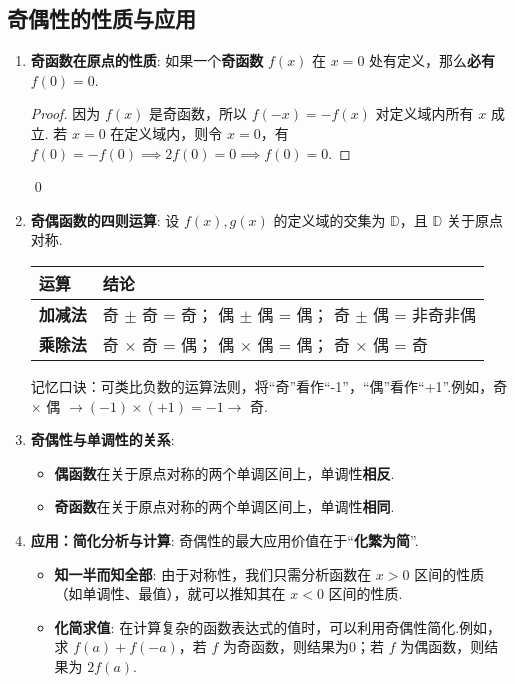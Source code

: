 \subsection{奇偶性的性质与应用}

\begin{enumerate}
	\item \textbf{奇函数在原点的性质}:
	如果一个\textbf{奇函数} $f(x)$ 在 $x=0$ 处有定义，那么\textbf{必有 $f(0)=0$}.
	\begin{proof}
		因为 $f(x)$ 是奇函数，所以 $f(-x)=-f(x)$ 对定义域内所有 $x$ 成立.
		若 $x=0$ 在定义域内，则令 $x=0$，有 $f(0) = -f(0) \implies 2f(0)=0 \implies f(0)=0$.
	\end{proof}
	\qed
	
	\item \textbf{奇偶函数的四则运算}:
	设 $f(x), g(x)$ 的定义域的交集为 $\mathbb{D}$，且 $\mathbb{D}$ 关于原点对称.
	\begin{center}
		\begin{tabular}{ll}
			\toprule
			\textbf{运算} & \textbf{结论} \\
			\midrule
			\textbf{加减法} & 奇 $\pm$ 奇 = 奇； 偶 $\pm$ 偶 = 偶； 奇 $\pm$ 偶 = 非奇非偶 \\
			\textbf{乘除法} & 奇 $\times$ 奇 = 偶； 偶 $\times$ 偶 = 偶； 奇 $\times$ 偶 = 奇 \\
			\bottomrule
		\end{tabular}
	\end{center}
	\textcolor{green!50!black}{记忆口诀：可类比负数的运算法则，将“奇”看作“-1”，“偶”看作“+1”.例如，奇 $\times$ 偶 $\to (-1) \times (+1) = -1 \to$ 奇.}
	
	\item \textbf{奇偶性与单调性的关系}:
	\begin{itemize}
		\item \textbf{偶函数}在关于原点对称的两个单调区间上，单调性\textbf{相反}.
		\item \textbf{奇函数}在关于原点对称的两个单调区间上，单调性\textbf{相同}.
	\end{itemize}
	
	\item \textbf{应用：简化分析与计算}:
	奇偶性的最大应用价值在于“\textbf{化繁为简}”.
	\begin{itemize}
		\item \textbf{知一半而知全部}: 由于对称性，我们只需分析函数在 $x>0$ 区间的性质（如单调性、最值），就可以推知其在 $x<0$ 区间的性质.
		\item \textbf{化简求值}: 在计算复杂的函数表达式的值时，可以利用奇偶性简化.例如，求 $f(a)+f(-a)$，若 $f$ 为奇函数，则结果为0；若 $f$ 为偶函数，则结果为 $2f(a)$.
	\end{itemize}
\end{enumerate}

